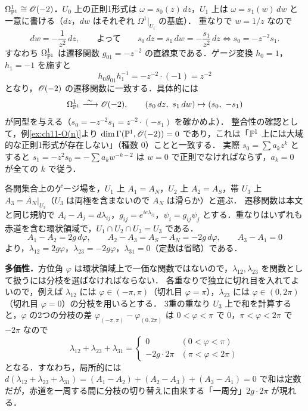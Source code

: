\textbf{$\Omega^1_{\mathbb{P}^1}\cong\mathscr{O}(-2)$．}$U_0$ 上の正則1形式は $\omega=s_0(z)\,dz$，$U_1$ 上は $\omega=s_1(w)\,dw$ と一意に書ける（$dz$，$dw$ はそれぞれ $\Omega^1|_{U_i}$ の基底）．
重なりで $w=1/z$ なので
\[
  dw=-\frac{1}{z^2}\,dz,\qquad\text{よって}\qquad s_0\,dz=s_1\,dw=-\frac{s_1}{z^2}\,dz\iff s_0=-z^{-2}s_1.
\]
すなわち $\Omega^1_{\mathbb{P}^1}$ は遷移関数 $g_{01}=-z^{-2}$ の直線束である．ゲージ変換 $h_0=1$，$h_1=-1$ を施すと
\[
  h_0g_{01}h_1^{-1}=-z^{-2}\cdot(-1)=z^{-2}
\]
となり，$\mathscr{O}(-2)$ の遷移関数に一致する．具体的には
\[
  \Omega^1_{\PP^1}\xrightarrow{\ \sim\ }\OO(-2),\qquad (s_0\,dz,\ s_1\,dw)\mapsto(s_0,\ -s_1)
\]
が同型を与える（$s_0=-z^{-2}s_1=z^{-2}\cdot(-s_1)$ を確かめよ）．
整合性の確認として，例\ref{ex:ch11-O(n)}より $\dim\Gamma(\mathbb{P}^1,\mathscr{O}(-2))=0$ であり，これは「$\mathbb{P}^1$ 上には大域的な正則1形式が存在しない」（種数 $0$）ことと一致する．
実際 $s_0=\sum a_kz^k$ とすると $s_1=-z^2s_0=-\sum a_kw^{-k-2}$ は $w=0$ で正則でなければならず，$a_k=0$ が全ての $k$ で従う．

各開集合上のゲージ場を，$U_1$ 上 $A_1=A_N$，$U_2$ 上 $A_2=A_S$，帯 $U_3$ 上 $A_3=A_N|_{U_3}$（$U_3$ は両極を含まないので $A_N$ は滑らか）と選ぶ．
遷移関数は本文と同じ規約で $A_i-A_j=d\lambda_{ij}$，$g_{ij}=e^{ie\lambda_{ij}}$，$\psi_i=g_{ij}\psi_j$ とする．重なりはいずれも赤道を含む環状領域で，$U_1\cap U_2\cap U_3=U_3$ である．
\[
  A_1-A_2=2g\,d\varphi,\qquad A_2-A_3=A_S-A_N=-2g\,d\varphi,\qquad A_3-A_1=0
\]
より，$\lambda_{12}=2g\varphi$，$\lambda_{23}=-2g\varphi$，$\lambda_{31}=0$（定数は省略）である．

\textbf{多価性．}方位角 $\varphi$ は環状領域上で一価な関数ではないので，$\lambda_{12},\lambda_{23}$ を関数として扱うには分枝を選ばなければならない．
各重なりで独立に切れ目を入れてよいので，例えば $\lambda_{12}$ には $\varphi\in(-\pi,\pi)$（切れ目 $\varphi=\pi$），$\lambda_{23}$ には $\varphi\in(0,2\pi)$（切れ目 $\varphi=0$）の分枝を用いるとする．
3重の重なり $U_3$ 上で和を計算すると，$\varphi$ の2つの分枝の差 $\varphi_{(-\pi,\pi)}-\varphi_{(0,2\pi)}$ は $0<\varphi<\pi$ で $0$，$\pi<\varphi<2\pi$ で $-2\pi$ なので
\[
  \lambda_{12}+\lambda_{23}+\lambda_{31}=
  \begin{cases}0&(0<\varphi<\pi)\\ -2g\cdot2\pi&(\pi<\varphi<2\pi)\end{cases}
\]
となる．すなわち，局所的には $d(\lambda_{12}+\lambda_{23}+\lambda_{31})=(A_1-A_2)+(A_2-A_3)+(A_3-A_1)=0$ で和は定数だが，赤道を一周する間に分枝の切り替えに由来する「一周分」$2g\cdot2\pi$ が現れる．

